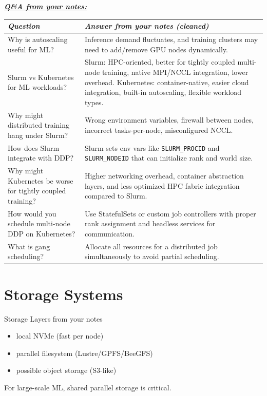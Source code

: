 \documentclass[12pt]{article}
\newcommand{\keysent}[1]{\textbf{\textit{\uline{#1}}}}
\let\origtextbf\textbf
\renewcommand{\textbf}[1]{\origtextbf{\textit{#1}}}
\begin{document}
\keysent{Q\&A from your notes:}\par
{\footnotesize
\begin{tabularx}{\textwidth}{|>{\raggedright\arraybackslash}p{4.1cm}|X|}
\hline
\textbf{Question} & \textbf{Answer from your notes (cleaned)} \\
\hline
Why is autoscaling useful for ML? & Inference demand fluctuates, and training clusters may need to add/remove GPU nodes dynamically. \\
\hline
Slurm vs Kubernetes for ML workloads? & Slurm: HPC-oriented, better for tightly coupled multi-node training, native MPI/NCCL integration, lower overhead. Kubernetes: container-native, easier cloud integration, built-in autoscaling, flexible workload types. \\
\hline
Why might distributed training hang under Slurm? & Wrong environment variables, firewall between nodes, incorrect tasks-per-node, misconfigured NCCL. \\
\hline
How does Slurm integrate with DDP? & Slurm sets env vars like \texttt{SLURM\_PROCID} and \texttt{SLURM\_NODEID} that can initialize rank and world size. \\
\hline
Why might Kubernetes be worse for tightly coupled training? & Higher networking overhead, container abstraction layers, and less optimized HPC fabric integration compared to Slurm. \\
\hline
How would you schedule multi-node DDP on Kubernetes? & Use StatefulSets or custom job controllers with proper rank assignment and headless services for communication. \\
\hline
What is gang scheduling? & Allocate all resources for a distributed job simultaneously to avoid partial scheduling. \\
\hline
\end{tabularx}
}

\vspace{2cm}

\section{Storage Systems}

\begin{bluebox}{Storage Layers from your notes}
\begin{itemize}
\item local NVMe (fast per node)
\item parallel filesystem (Lustre/GPFS/BeeGFS)
\item possible object storage (S3-like)
\end{itemize}
For large-scale ML, shared parallel storage is critical.
\end{bluebox}
\end{document}
